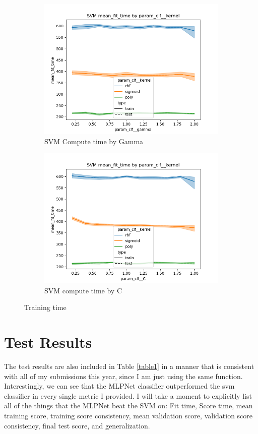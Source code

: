\documentclass[12pt]{article}
\begin{document}
\begin{figure}
    \begin{subfigure}{.5\textwidth}
      \includegraphics[width=.95\textwidth]{../results/svm/param_clf__kernel_mean_fit_time_param_clf__gamma.png}
      \caption{SVM Compute time by Gamma}
      \end{subfigure}%
    \begin{subfigure}{.5\textwidth}
      \includegraphics[width=.95\textwidth]{../results/svm/param_clf__kernel_mean_fit_time_param_clf__C.png}
      \caption{SVM compute time by C}
    \end{subfigure}
    \caption{Training time}
    \label{figure3}
\end{figure}

\section{Test Results}
The test results are also included in Table \ref{table1} in a manner that is consistent with all of my submissions this year,
since I am just using the same function. Interestingly, we can see that the MLPNet classifier outperformed the svm classifier
in every single metric I provided. I will take a moment to explicitly list all of the things that the MLPNet beat the SVM on:
Fit time, Score time, mean training score, training score consistency, mean validation score, validation score consistency,
final test score, and generalization. 
\end{document}
